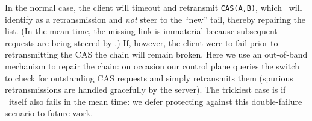 In the normal case, the client will timeout and retransmit
\texttt{CAS(A,B)}, which \sword\ will identify as a retransmission and
\emph{not} steer to the ``new'' tail, thereby repairing the list.  (In
the mean time, the missing link is immaterial because
subsequent requests are being steered by \sword.)  If, however, the client
were to fail prior to retransmitting the CAS the chain will remain broken.
Here we use an out-of-band mechanism to repair the chain: on occasion
our control plane queries the switch to check for outstanding CAS
requests and simply retransmits them (spurious retransmissions are
handled gracefully by the server).  The trickiest case is if
\sword\ itself also fails in the mean time: we defer protecting
against this double-failure scenario to future work.





